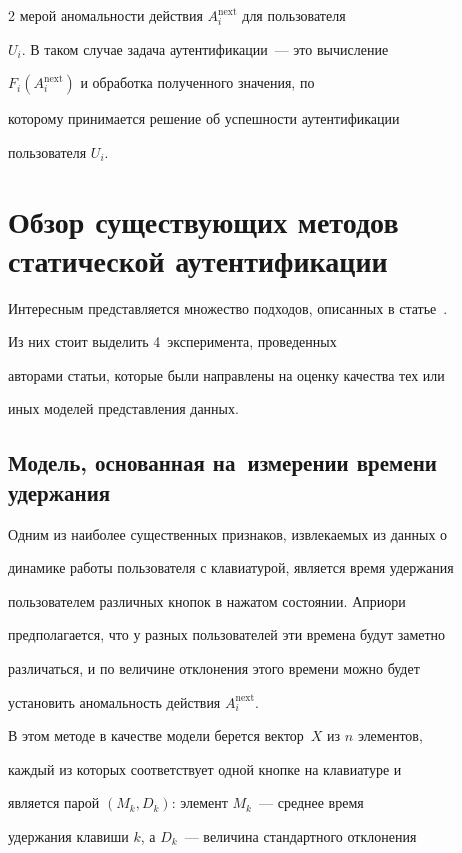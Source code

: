 \begin{multicols}{2}
мерой аномальности действия $A^{\mathrm{next}}_i$ для пользователя

$U_i$. В таком случае задача аутентификации~--- это вычисление

$F_i(A^{\mathrm{next}}_i)$ и обработка полученного значения, по

которому принимается решение об успешности аутентификации

пользователя $U_i$.



\section{Обзор существующих методов статической аутентификации}



Интересным представляется множество подходов, описанных в статье~\cite{lao}. 

Из них стоит выделить 4~эксперимента, проведенных

авторами статьи, которые были направлены на оценку качества тех или

иных моделей представления данных.



\subsection{Модель, основанная на~измерении времени удержания}\label{hold}



Одним из наиболее существенных признаков, извлекаемых из данных о

динамике работы пользователя с клавиатурой, является время удержания

пользователем различных кнопок в нажатом состоянии. Априори

предполагается, что у разных пользователей эти времена будут заметно

различаться, и по величине отклонения этого времени можно будет

установить аномальность действия $A_i^{\mathrm{next}}$.



В этом методе в качестве модели берется вектор~$X$ из $n$ элементов,

каждый из которых соответствует одной кнопке на клавиатуре и

является парой $(M_k, D_k)$: элемент $M_k$~--- среднее время

удержания клавиши $k$, а $D_k$~--- величина стандартного отклонения


\end{multicols}

